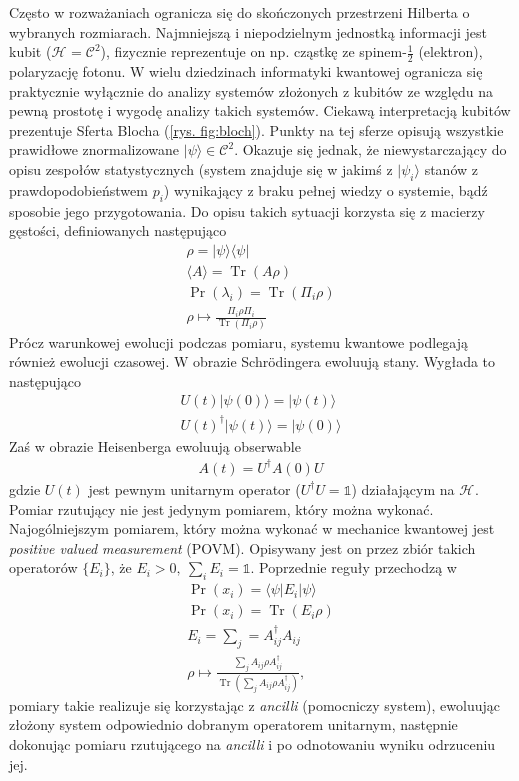 \documentclass[10pt]{article} %
\DeclareMathOperator{\Trs}{Tr}
\newcommand{\Hx}[1]{\mathcal{H}^{#1}}
\newcommand{\Tr}[1]{\Trs(#1)}
\newcommand{\Pro}[1]{\Pr(#1)}
\newcommand{\Ket}[1]{|#1\rangle}
\newcommand{\Bra}[1]{\langle#1|}
\newcommand{\Braket}[1]{\langle#1\rangle}
\newcommand{\KP}{\Ket{\psi}}
\newcommand{\BP}{\Bra{\psi}}
\begin{document}
Często w rozważaniach ogranicza się do skończonych przestrzeni Hilberta o wybranych rozmiarach. Najmniejszą i niepodzielnym jednostką informacji jest kubit ($\Hx{} = \mathcal{C}^2$), fizycznie reprezentuje on np. cząstkę ze spinem-$\frac{1}{2}$ (elektron), polaryzację fotonu. W wielu dziedzinach informatyki kwantowej ogranicza się praktycznie wyłącznie do analizy systemów złożonych z kubitów ze względu
na pewną prostotę i wygodę analizy takich systemów. Ciekawą interpretacją kubitów prezentuje Sferta Blocha (\ref{rys. fig:bloch}). Punkty na tej sferze opisują wszystkie prawidłowe znormalizowane $\KP \in \mathcal{C}^2$.
Okazuje się jednak, że niewystarczający do opisu zespołów statystycznych (system znajduje się w jakimś z $\Ket{\psi_i}$ stanów z prawdopodobieństwem $p_i$) wynikający z braku pełnej wiedzy o systemie, bądź sposobie jego przygotowania. Do opisu takich sytuacji korzysta się z macierzy gęstości, definiowanych następująco
\begin{gather}
\rho = \KP \BP \\
\Braket{A} = \Tr{A\rho} \\
\Pro{\lambda_i} = \Tr{\Pi_i \rho}\\
\rho \mapsto \frac{\Pi_i\rho\Pi_i}{\Trs(\Pi_i\rho)}
\end{gather}
Prócz warunkowej ewolucji podczas pomiaru, systemu kwantowe podlegają również ewolucji czasowej. W obrazie Schrödingera ewoluują stany. Wygłada to następująco
\begin{gather}
U(t)\Ket{\psi(0)} = \Ket{\psi(t)} \\
U(t)^\dag\Ket{\psi(t)} = \Ket{\psi(0)}
\end{gather}
Zaś w obrazie Heisenberga ewoluują obserwable
\begin{gather}
A(t) = U^\dag A(0)U
\end{gather}
gdzie $U(t)$ jest pewnym unitarnym operator ($U^\dag U = \mathbb{1}$) działającym na $\Hx{}$. Pomiar rzutujący nie jest jedynym pomiarem, który można wykonać. Najogólniejszym pomiarem, który można wykonać w mechanice kwantowej jest \textit{positive valued measurement} (POVM). Opisywany jest on przez
zbiór takich operatorów $\{E_i\}$, że $E_i > 0,~\sum_i E_i = \mathbb{1}$. Poprzednie reguły przechodzą w
\begin{gather}
\Pro{x_i} = \Bra{\psi} E_i \Ket{\psi}\\
\Pro{x_i} = \Tr{E_i \rho} \\
E_i = \sum_j = A^\dag_{ij}A_{ij} \\ 
\rho \mapsto \frac{\sum_j A_{ij} \rho A^\dag_{ij}}{\Tr{\sum_j A_{ij} \rho A^\dag_{ij}}},
\end{gather} pomiary takie realizuje się korzystając z \textit{ancilli} (pomocniczy system), ewoluując złożony system odpowiednio dobranym operatorem unitarnym, następnie dokonując pomiaru rzutującego na \textit{ancilli} i po odnotowaniu wyniku odrzuceniu jej.
\end{document}
